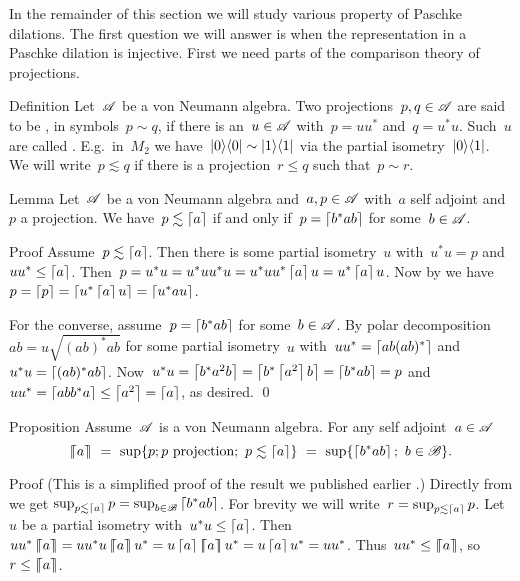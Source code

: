 \documentclass[b]{subfiles}
\begin{document}
\begin{parsec}%
\begin{point}%
In the remainder of this section we will study various property
    of Paschke dilations.
The first question we will answer is
    when the representation in a Paschke dilation is injective.
First we need parts of the comparison theory of projections.
\end{point}
\begin{point}{Definition}%
Let~$\mathscr{A}$ be a von Neumann algebra.
Two projections~$p,q \in \mathscr{A}$ are said to be
    ,
    in symbols~$p \sim q$,
    if there is an~$u \in \mathscr{A}$
    with~$p = uu^*$ and~$q = u^*u$.
Such~$u$ are called .
E.g.~in~$M_2$ we have~$\left|0\right>\!\left<0\right| \sim \left|1\right>\!\left<1\right|$
    via the partial isometry~$\left|0\right>\!\left<1\right|$.
We will write~$p \lesssim q$
    if there is a projection~$r \leq q$
    such that~$p \sim r$.
\end{point}
\begin{point}{Lemma}%
Let~$\mathscr{A}$ be a von Neumann algebra
    and~$a,p \in \mathscr{A}$ with~$a$ self adjoint and~$p$ a projection.
We have~$p \lesssim \left\lceil a\right\rceil$
    if and only if~$p = \left\lceil b^* a b\right\rceil$ for some~$b \in \mathscr{A}$.
\begin{point}{Proof}%
Assume~$p \lesssim \left\lceil a\right\rceil$.
Then there is some partial isometry~$u$
    with~$u^*u = p$ and~$uu^* \leq \left\lceil a\right\rceil$.
Then~$p = u^*u= u^*uu^*u = u^*uu^*\left\lceil a\right\rceil u = u^*\left\lceil a\right\rceil u$.
Now by  we have~$p = \left\lceil p\right\rceil = \left\lceil u^*\left\lceil a\right\rceil u\right\rceil=\left\lceil u^*au\right\rceil$.

For the converse, assume~$p = \left\lceil b^*ab\right\rceil$ for some~$b \in \mathscr{A}$.
By polar decomposition ~$ab = u \sqrt{(ab)^*ab}$
    for some partial isometry~$u$
    with~$uu^* = \left\lceil ab(ab)^*\right\rceil$ and~$u^*u = \left\lceil(ab)^*ab\right\rceil$.
Now~$u^*u = \left\lceil b^*a^2b\right\rceil = \left\lceil b^*\left\lceil a^2\right\rceil b\right\rceil = \left\lceil b^*ab\right\rceil=p$
and~$uu^* = \left\lceil abb^*a\right\rceil \leq \left\lceil a^2\right\rceil = \left\lceil a\right\rceil$, as desired. \qed
\end{point}
\end{point}
\begin{point}{Proposition}%
Assume~$\mathscr{A}$ is a von Neumann algebra.
For any self adjoint~$a \in \mathscr{A}$
\begin{equation*}
    \cceil{a} \ =\  \sup \{p; p \text{ projection}; \ p \lesssim \ceil{a} \}
            \ = \ \sup \{ \ceil{b^*ab}; \ b\in \scrB \}.
\end{equation*}
\begin{point}{Proof}%
(This is a simplified proof of the result we published
earlier \cite[Thm.~28 sub 1]{wwpaschke}.)
Directly from 
    we get $\sup_{p \lesssim \left\lceil a\right\rceil} p = \sup_{b \in \mathscr{B}} \left\lceil b^*ab\right\rceil$.
For brevity we will write~$r = \sup_{p \lesssim \left\lceil a\right\rceil} p$.
Let~$u$ be a partial isometry with~$u^*u \leq \left\lceil a\right\rceil$.
Then~$uu^*\cceil{a} = uu^*u \cceil{a} u^*= u \ceil{a} \cceil{a} u^*
        = u \ceil{a} u^*  = uu^*$.
Thus~$uu^* \leq \left\lceil\!\!\left\lceil a\right\rceil\!\!\right\rceil$, so~$r \leq \left\lceil\!\!\left\lceil a\right\rceil\!\!\right\rceil$.


\end{point}
\end{point}
\end{parsec}
\end{document}
